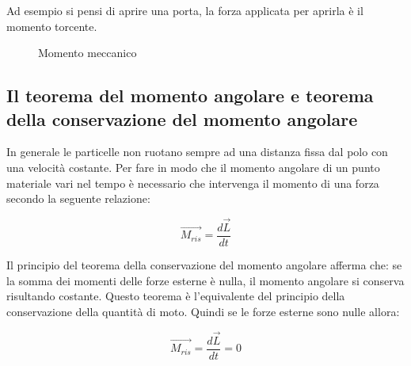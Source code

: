 Ad esempio si pensi di aprire una porta, la forza applicata per aprirla è il momento torcente.


\begin{figure}[H]
    \centering
    \caption{Momento meccanico}
    \label{fig:momentoMec}
\end{figure}


\newpage
\subsection{Il teorema del momento angolare e teorema della conservazione del momento angolare}

In generale le particelle non ruotano sempre ad una distanza fissa dal polo con una velocità costante. Per fare in modo che il momento angolare di un punto materiale vari nel tempo è necessario che intervenga il momento di una forza secondo la seguente relazione:

\begin{equation}
    \vec{M_{ris}} = \frac{d\vec{L}}{dt}
\end{equation}

Il principio del teorema della conservazione del momento angolare afferma che: se la somma dei momenti delle forze esterne è nulla, il momento angolare si conserva risultando costante. Questo teorema è l'equivalente del principio della conservazione della quantità di moto.
Quindi se le forze esterne sono nulle allora: 

\begin{equation}
    \vec{M_{ris}} = \frac{d\vec{L}}{dt} = 0
    \label{ConservazioneMomentoAng}
\end{equation}

